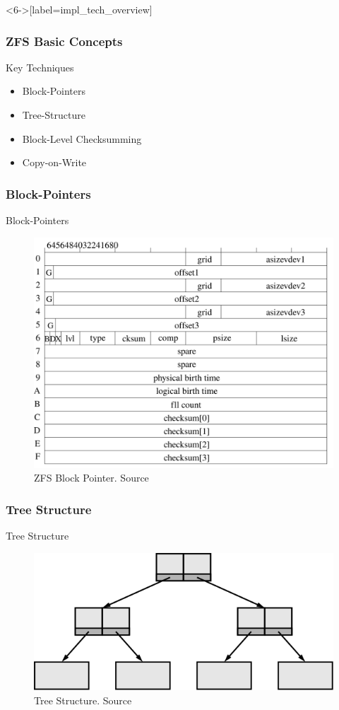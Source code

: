 \begin{frame}<6->[label=impl_tech_overview]
	\frametitle{ZFS Basic Concepts}
	{\Large Key Techniques}\\
	\begin{itemize}
		\item \alert<2>{Block-Pointers}
		\item \alert<3>{Tree-Structure}
		\item \alert<4>{Block-Level Checksumming}
		\item \alert<5>{Copy-on-Write}
	\end{itemize}
\end{frame}

\subsubsection{Block-Pointers}
\begin{frame}{Block-Pointers}
	\begin{figure}
	\centering
	\includegraphics[height=0.75\textheight]{assets/contrib/mckusick/block_pointer}
	\caption{ZFS Block Pointer. Source \cite{introimplzfs}}
	\end{figure}
\end{frame}

\subsubsection{Tree Structure}
\begin{frame}{Tree Structure}
	\begin{figure}
	\centering
	\includegraphics[width=0.6\linewidth]{assets/contrib/zfs2003/tree_structure}
	\caption{Tree Structure. Source \cite{zfs2003}}
	\end{figure}
\end{frame}

